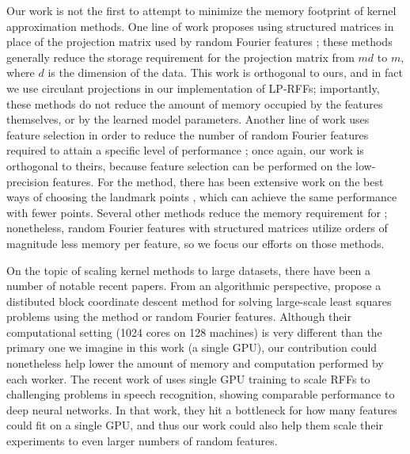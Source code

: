 Our work is not the first to attempt to minimize the memory footprint of kernel approximation methods.  One line of work proposes using structured matrices in place of the projection matrix used by random Fourier features \citep{fastfood,yu15,sphereRKS}; these methods generally reduce the storage requirement for the projection matrix from $md$ to $m$, where $d$ is the dimension of the data. This work is orthogonal to ours, and in fact we use circulant projections \citep{yu15} in our implementation of LP-RFFs; importantly, these methods do not reduce the amount of memory occupied by the features themselves, or by the learned model parameters. Another line of work uses feature selection in order to reduce the number of random Fourier features required to attain a specific level of performance \citep{sparseRKS, may2016}; once again, our work is orthogonal to theirs, because feature selection can be performed on the low-precision features.  For the \Nystrom method, there has been extensive work on the best ways of choosing the landmark points \citep{kmeans08,kumar12,gittens13}, which can achieve the same performance with fewer points.  Several other methods reduce the memory requirement for \Nystrom \cite{ensemble09,fastpred14,meka14}; nonetheless, random Fourier features with structured matrices utilize orders of magnitude less memory per feature, so we focus our efforts on those methods.

On the topic of scaling kernel methods to large datasets, there have been a number of notable recent papers.  From an algorithmic perspective, \citet{block16} propose a distibuted block coordinate descent method for solving large-scale least squares problems using the \Nystrom method or random Fourier features.  Although their computational setting (1024 cores on 128 machines) is very different than the primary one we imagine in this work (a single GPU), our contribution could nonetheless help lower the amount of memory and computation performed by each worker.  The recent work of \citet{may2017} uses single GPU training to scale RFFs to challenging problems in speech recognition, showing comparable performance to deep neural networks.  In that work, they hit a bottleneck for how many features could fit on a single GPU, and thus our work could also help them scale their experiments to even larger numbers of random features.

